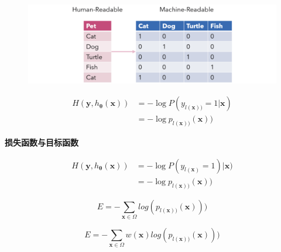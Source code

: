 \documentclass{beamer}%
\begin{document}
\begin{frame}
    \begin{figure}
        \vspace{-0.2cm}  %
        \setlength{\belowcaptionskip}{-0.4cm}   %
        \setlength{\abovecaptionskip}{0.4cm}   %
        \centering%
        \hspace{2.5cm}\includegraphics[width=0.6\linewidth]{one-hot-encoding.png}
    \end{figure}
    {\setlength\abovedisplayskip{0.1cm}
    \setlength\belowdisplayskip{0.1cm}
    \begin{equation}\label{equ:cross_entropy}
        \begin{split}
            H(\mathbf{y}, h_{\mathbf{\theta}}(\mathbf{x})) &= -\log P(y_{l(\mathbf{x}))} = 1|\mathbf{x})\\
            &= -\log p_{l(\mathbf{x}))}(\mathbf{x}))
        \end{split}
    \end{equation}
    }

\end{frame}

\begin{frame}
    \vspace{-0.1cm}
    {\noindent\large\textbf{损失函数与目标函数}}
    \vspace{0.4cm}

    {\setlength\abovedisplayskip{0.1cm}
        \setlength\belowdisplayskip{0.1cm}
        \begin{equation}\label{equ:cross_entropy}
            \begin{split}
                H(\mathbf{y}, h_{\mathbf{\theta}}(\mathbf{x})) &= -\log P(y_{l(\mathbf{x})}=1)|\mathbf{x})\\
                &= -\log p_{l(\mathbf{x}))}(\mathbf{x}))
            \end{split}
        \end{equation}
    }

    \begin{equation}\label{equ:cross_entropysimplized}
        E = -\sum\limits_{\mathbf{x} \in \Omega} log(p_{l(\mathbf{x}))}(\mathbf{x})))
    \end{equation}

    \begin{equation}\label{equ:unetobj}
        E = -\sum\limits_{\mathbf{x} \in \Omega} w(\mathbf{x}) log(p_{l(\mathbf{x}))}(\mathbf{x})))
    \end{equation}
\end{frame}
\end{document}

